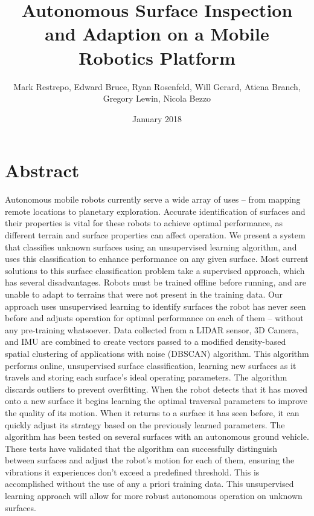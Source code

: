 \documentclass{article}
\title{Autonomous Surface Inspection and Adaption on a Mobile Robotics Platform}
\author{Mark Restrepo, Edward Bruce, Ryan Rosenfeld, Will Gerard, Atiena Branch, Gregory Lewin, Nicola Bezzo}
\date{January 2018}
\begin{document}
\section{Abstract}



Autonomous mobile robots currently serve a wide array of uses -- from mapping remote locations to planetary exploration. Accurate identification of surfaces and their properties is vital for these robots to achieve optimal performance, as different terrain and surface properties can affect operation. We present a system that classifies unknown surfaces using an unsupervised learning algorithm, and uses this classification to enhance performance on any given surface. Most current solutions to this surface classification problem take a supervised approach, which has several disadvantages. Robots must be trained offline before running, and are unable to adapt to terrains that were not present in the training data. Our approach uses unsupervised learning to identify surfaces the robot has never seen before and adjusts operation for optimal performance on each of them -- without any pre-training whatsoever. Data collected from a LIDAR sensor, 3D Camera, and IMU are combined to create vectors passed to a modified density-based spatial clustering of applications with noise (DBSCAN) algorithm. This algorithm performs online, unsupervised surface classification, learning new surfaces as it travels and storing each surface's ideal operating parameters. The algorithm discards outliers to prevent overfitting. When the robot detects that it has moved onto a new surface it begins learning the optimal traversal parameters to improve the quality of its motion. When it returns to a surface it has seen before, it can quickly adjust its strategy based on the previously learned parameters. The algorithm has been tested on several surfaces with an autonomous ground vehicle. These tests have validated that the algorithm can successfully distinguish between surfaces and adjust the robot's motion for each of them, ensuring the vibrations it experiences don't exceed a predefined threshold. This is accomplished without the use of any a priori training data. This unsupervised learning approach will allow for more robust autonomous operation on unknown surfaces. 
\end{document}
